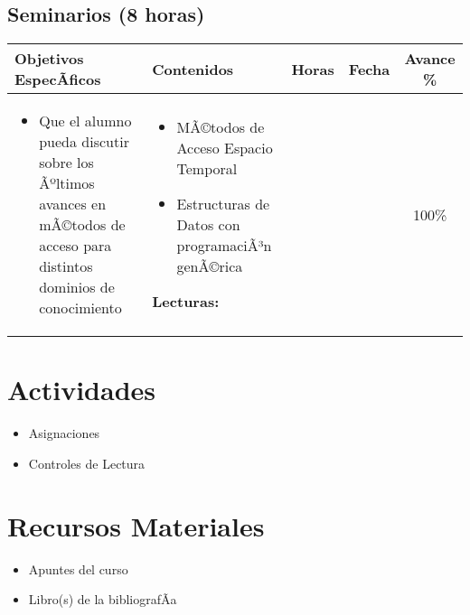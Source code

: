 \documentclass[a4paper]{article}
\newenvironment{unitgoals}
{ \begin{itemize} }
{ \end{itemize}   }
\newenvironment{topics}
{ \begin{itemize} }
{ \end{itemize}   }
\begin{document}
\subsection{Seminarios (8 horas)}
\begin{tabularx}{\textwidth}{|X|X|c|c|c|}
\hline
\textbf{Objetivos EspecÃ­ficos} &   \textbf{Contenidos} & \textbf{Horas} & \textbf{Fecha} & \textbf{Avance \%}  \\ \hline
\begin{unitgoals}
         \item Que el alumno pueda discutir sobre los Ãºltimos avances en mÃ©todos de acceso para distintos dominios de conocimiento
   \end{unitgoals}      &
\begin{topics}
         \item MÃ©todos de Acceso Espacio Temporal
         \item Estructuras de Datos con programaciÃ³n genÃ©rica
   \end{topics}
{\bf Lecturas:} \cite{Chavez:01} &
&
&
100\%
\\
\hline
\end{tabularx}




\section{Actividades}
\begin{itemize}
\item Asignaciones
\item Controles de Lectura
\end{itemize} 

\section{Recursos Materiales}
\begin{itemize}
\item Apuntes del curso
\item Libro(s) de la bibliografÃ­a
\end{itemize} 
\end{document}
